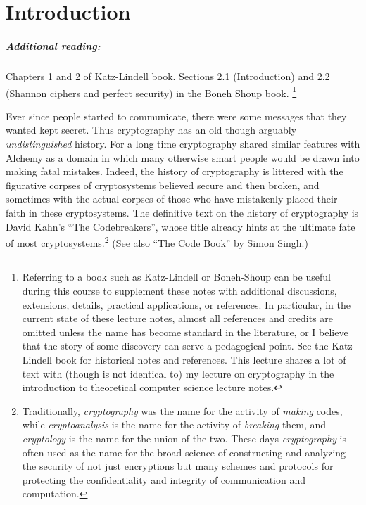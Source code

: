 \chapter{Introduction}\label{1-Introduction}

\paragraph{Additional reading:} Chapters 1 and 2 of Katz-Lindell book.
Sections 2.1 (Introduction) and 2.2 (Shannon ciphers and perfect
security) in the Boneh Shoup book. \footnote{Referring to a book such as
  Katz-Lindell or Boneh-Shoup can be useful during this course to
  supplement these notes with additional discussions, extensions,
  details, practical applications, or references. In particular, in the
  current state of these lecture notes, almost all references and
  credits are omitted unless the name has become standard in the
  literature, or I believe that the story of some discovery can serve a
  pedagogical point. See the Katz-Lindell book for historical notes and
  references. This lecture shares a lot of text with (though is not
  identical to) my lecture on cryptography in the
  \href{http://introtcs.org}{introduction to theoretical computer
  science} lecture notes.}

Ever since people started to communicate, there were some messages that
they wanted kept secret. Thus cryptography has an old though arguably
\emph{undistinguished} history. For a long time cryptography shared
similar features with Alchemy as a domain in which many otherwise smart
people would be drawn into making fatal mistakes. Indeed, the history of
cryptography is littered with the figurative corpses of cryptosystems
believed secure and then broken, and sometimes with the actual corpses
of those who have mistakenly placed their faith in these cryptosystems.
The definitive text on the history of cryptography is David Kahn's ``The
Codebreakers'', whose title already hints at the ultimate fate of most
cryptosystems.\footnote{Traditionally, \emph{cryptography} was the name
  for the activity of \emph{making} codes, while \emph{cryptoanalysis}
  is the name for the activity of \emph{breaking} them, and
  \emph{cryptology} is the name for the union of the two. These days
  \emph{cryptography} is often used as the name for the broad science of
  constructing and analyzing the security of not just encryptions but
  many schemes and protocols for protecting the confidentiality and
  integrity of communication and computation.} (See also ``The Code
Book'' by Simon Singh.)

